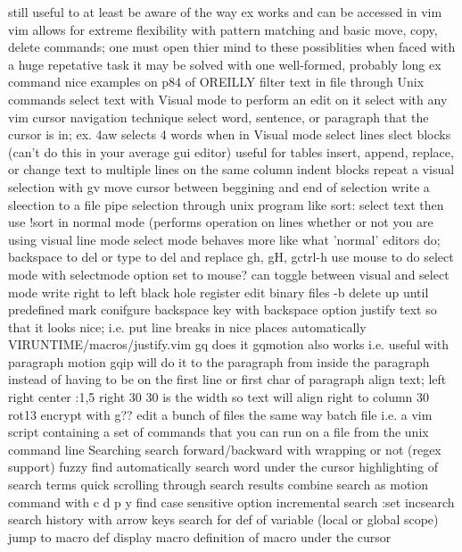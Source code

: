 \documentclass[12pt]{book}
\begin{document}
{    still useful to at least be aware of the way ex works and can be accessed in vim
    vim allows for extreme flexibility with pattern matching and basic move, copy, delete commands; one must open thier mind to these possiblities when faced with a huge repetative task
    it may be solved with one well-formed, probably long ex command
    nice examples on p84 of OREILLY
  filter text in file through Unix commands
  select text with Visual mode to perform an edit on it
    select with any vim cursor navigation technique
    select word, sentence, or paragraph that the cursor is in; ex. 4aw selects 4 words when in Visual mode
    select lines
    slect blocks (can't do this in your average gui editor)
      useful for tables
      insert, append, replace, or change text to multiple lines on the same column
      indent blocks
    repeat a visual selection with gv
    move cursor between beggining and end of selection
    write a sleection to a file
    pipe selection through unix program like sort: select text then use !sort in normal mode (performs operation on lines whether or not you are using visual line mode
    select mode
      behaves more like what 'normal' editors do; backspace to del or type to del and replace
      gh, gH, gctrl-h
      use mouse to do select mode with selectmode option set to mouse?
      can toggle between visual and select mode
  write right to left
  black hole register
  edit binary files -b
  delete up until predefined mark
  conifgure backspace key with backspace option
  justify text so that it looks nice; i.e. put line breaks in nice places automatically
    VIRUNTIME/macros/justify.vim
    gq does it
    gqmotion also works i.e. useful with paragraph motion
    gqip will do it to the paragraph from inside the paragraph instead of having to be on the first line or first char of paragraph
  align text; left right center
    :1,5 right 30
    30 is the width so text will align right to column 30
  rot13 encrypt with g??
  edit a bunch of files the same way
    batch file i.e. a vim script containing a set of commands that you can run on a file from the unix command line
Searching
  search forward/backward with wrapping or not (regex support)
  fuzzy find
  automatically search word under the cursor
  highlighting of search terms
  quick scrolling through search results
  combine search as motion command with c d p y
  find
  case sensitive option
  incremental search :set incsearch
  search history with arrow keys
  search for def of variable (local or global scope)
  jump to macro def
  display macro definition of macro under the cursor
}
\end{document}
